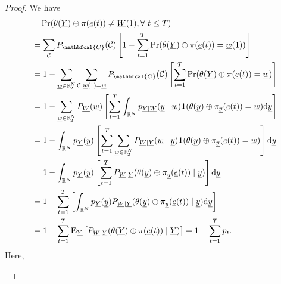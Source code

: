 \documentclass[letterpaper,draftclsnofoot,onecolumn]{IEEEtran}
\begin{document}
\begin{proof} We have
    \begin{align}
    & \quad \Pr(\theta(\underline{Y})\oplus \pi(\underline{e}(t))\neq \underline{W}(1),\forall\ t \leq  T) \notag \\
    & = \sum_{\mathcal{C}} P_{\mathbfcal{C}}(\mathcal{C})\left[1-\sum_{t=1}^{T}\Pr(\theta(\underline{Y})\oplus \pi(\underline{e}(t))= \underline{w}(1))\right] \label{eq:Long1.1}\\
    & = 1 - \sum_{\underline{w}\in \mathbb{F}_2^N}\sum_{\mathcal{C}:\underline{w}(1)=\underline{w}} P_{\mathbfcal{C}}(\mathcal{C})\left[\sum_{t=1}^{T}\Pr(\theta(\underline{Y})\oplus \pi(\underline{e}(t))= \underline{w})\right] \label{eq:Long1.3}\\
    & = 1 - \sum_{\underline{w}\in \mathbb{F}_2^N} P_{\underline{W}}(\underline{w}) \left[\sum_{t=1}^{T} \int_{\mathbb{R}^N} p_{\underline{Y}|\underline{W}}(\underline{y} \mid \underline{w}) \mathbf{1}(\theta(\underline{y})\oplus \pi_{\underline{y}}(\underline{e}(t))= \underline{w})\mathrm{d}\underline{y}\right] \label{eq:Long1.4}\\
    & = 1 - \int_{\mathbb{R}^N}p_{\underline{Y}}(\underline{y})\left[ \sum_{t=1}^{T} \sum_{\underline{w}\in \mathbb{F}_2^N} P_{\underline{W}|\underline{Y}}(\underline{w} \mid \underline{y}) \mathbf{1}(\theta(\underline{y})\oplus \pi_{\underline{y}}(\underline{e}(t))= \underline{w})\right]\mathrm{d}\underline{y} \label{eq:Long1.5}\\
    & = 1 - \int_{\mathbb{R}^N}p_{\underline{Y}}(\underline{y})\left[ \sum_{t=1}^{T}P_{\underline{W}|\underline{Y}}(\theta(\underline{y})\oplus \pi_{\underline{y}}(\underline{e}(t)) \mid \underline{y})\right]\mathrm{d}\underline{y} \label{eq:Long1.6}\\
    & = 1 - \sum_{t=1}^{T}\left[ \int_{\mathbb{R}^N}p_{\underline{Y}}(\underline{y})P_{\underline{W}|\underline{Y}}(\theta(\underline{y})\oplus \pi_{\underline{y}}(\underline{e}(t)) \mid \underline{y})\mathrm{d}\underline{y}\right] \\
    & = 1 - \sum_{t=1}^{T}\mathbf{E}_{\underline{Y}} \left[P_{\underline{W}|\underline{Y}}(\theta(\underline{Y})\oplus \pi(\underline{e}(t)) \mid \underline{Y})\right] = 1 - \sum_{t=1}^{T} p_t .
    \end{align}
    Here,
    \begin{itemize}

\end{itemize}
\end{proof}
\end{document}
